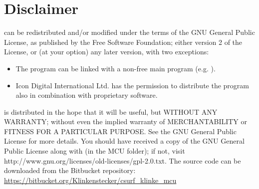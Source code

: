 \section{Disclaimer}\label{disclaimer}

\mcu can be redistributed and/or modified under the terms of the GNU
General Public License, as published by the Free Software Foundation;
either version 2 of the License, or (at your option) any later
version, with two exceptions:
\begin{itemize}
\item The program can be linked with a non-free main program (e.g. \reaper).
\item Icon Digital International Ltd. has the permission to
  distribute the program also in combination with proprietary software.
\end{itemize}

\mcu is distributed in the hope that it will be useful, but
WITHOUT ANY WARRANTY; without even the implied warranty of
MERCHANTABILITY or FITNESS FOR A PARTICULAR PURPOSE. See the GNU
General Public License for more details.  You should have received a
copy of the GNU General Public License along with \mcu (in the MCU
folder); if not, visit
http://www.gnu.org/licenses/old-licenses/gpl-2.0.txt.  The source code
can be downloaded from the Bitbucket repository:
\url{https://bitbucket.org/Klinkenstecker/csurf\_klinke\_mcu}

